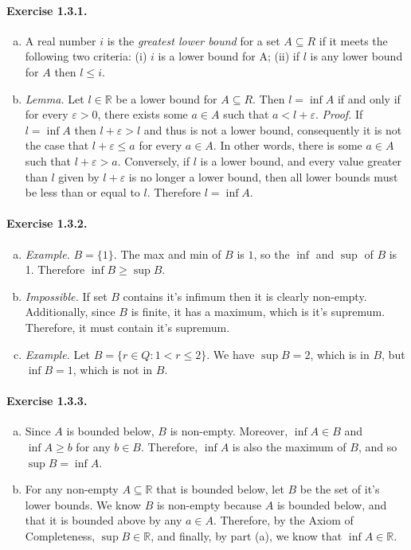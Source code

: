 \documentclass{article}
\newcommand{\R}{\mathbb{R}}
\begin{document}
\paragraph{Exercise 1.3.1.}
\begin{enumerate}[(a)]
    \item A real number $i$ is the \textit{greatest lower bound} for a set $A \subseteq R$ if it meets the following two criteria: (i) $i$ is a lower bound for A; (ii) if $l$ is any lower bound for $A$ then $l \leq i$.
    \item \textit{Lemma.} Let $l \in \R$ be a lower bound for $A \subseteq R$. Then $l = \inf A$ if and only if for every $\varepsilon > 0$, there exists some $a\in A$ such that $a < l + \varepsilon$. \textit{Proof.} If $l=\inf A$ then $l + \varepsilon > l$ and thus is not a lower bound, consequently it is not the case that $l + \varepsilon \leq a$ for every $a \in A$. In other words, there is some $a \in A$ such that $l + \varepsilon > a$. Conversely, if $l$ is a lower bound, and every value greater than $l$ given by $l + \varepsilon$ is no longer a lower bound, then all lower bounds must be less than or equal to $l$. Therefore $l = \inf A$.
\end{enumerate}

\paragraph{Exercise 1.3.2.}
\begin{enumerate}[(a)]
    \item \textit{Example.} $B = \{1\}.$ The max and min of $B$ is $1$, so the $\inf$ and $\sup$ of $B$ is 1. Therefore $\inf B \geq \sup B$.
    \item \textit{Impossible.} If set $B$ contains it's infimum then it is clearly non-empty. Additionally, since $B$ is finite, it has a maximum, which is it's supremum. Therefore, it must contain it's supremum.
    \item \textit{Example.} Let $B = \{ r \in Q : 1 < r \leq 2 \}$. We have $\sup B = 2$, which is in $B$, but $\inf B = 1$, which is not in $B$.
\end{enumerate}

\paragraph{Exercise 1.3.3.}
\begin{enumerate}[(a)]
    \item Since $A$ is bounded below, $B$ is non-empty. Moreover, $\inf A \in B$ and $\inf A \geq b$ for any $b \in B$. Therefore, $\inf A$ is also the maximum of $B$, and so $\sup B = \inf A$.
    \item For any non-empty $A \subseteq \R$ that is bounded below, let $B$ be the set of it's lower bounds. We know $B$ is non-empty because $A$ is bounded below, and that it is bounded above by any $a \in A$. Therefore, by the Axiom of Completeness, $\sup B \in \R$, and finally, by part (a), we know that $\inf A \in \R$.
\end{enumerate}
\end{document}
